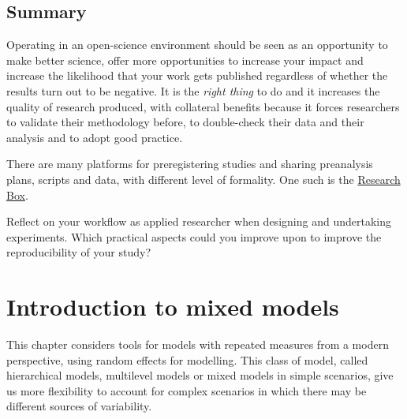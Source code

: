 \documentclass[
  11pt,
  letterpaper,
]{scrbook}
\theoremstyle{definition}
\theoremstyle{definition}
\theoremstyle{remark}
\begin{document}
\section{Summary}\label{summary-4}

Operating in an open-science environment should be seen as an
opportunity to make better science, offer more opportunities to increase
your impact and increase the likelihood that your work gets published
regardless of whether the results turn out to be negative. It is the
\emph{right thing} to do and it increases the quality of research
produced, with collateral benefits because it forces researchers to
validate their methodology before, to double-check their data and their
analysis and to adopt good practice.

There are many platforms for preregistering studies and sharing
preanalysis plans, scripts and data, with different level of formality.
One such is the \href{https://researchbox.org/}{Research Box}.

\begin{tcolorbox}[enhanced jigsaw, bottomrule=.15mm, coltitle=black, colframe=quarto-callout-tip-color-frame, left=2mm, opacityback=0, breakable, opacitybacktitle=0.6, rightrule=.15mm, toprule=.15mm, title=\textcolor{quarto-callout-tip-color}{\faLightbulb}\hspace{0.5em}{Your turn}, toptitle=1mm, leftrule=.75mm, titlerule=0mm, colback=white, arc=.35mm, bottomtitle=1mm, colbacktitle=quarto-callout-tip-color!10!white]

Reflect on your workflow as applied researcher when designing and
undertaking experiments. Which practical aspects could you improve upon
to improve the reproducibility of your study?

\end{tcolorbox}


\chapter{Introduction to mixed
models}\label{introduction-to-mixed-models}

This chapter considers tools for models with repeated measures from a
modern perspective, using random effects for modelling. This class of
model, called hierarchical models, multilevel models or mixed models in
simple scenarios, give us more flexibility to account for complex
scenarios in which there may be different sources of variability.
\end{document}
